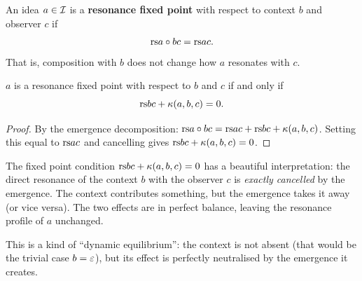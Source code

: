 \begin{definition}
\label{def:resonance-fp}
An idea $a \in \mathcal{I}$ is a \textbf{resonance fixed point} with respect to
context $b$ and observer $c$ if
\[
  \mathrm{rs}{a \circ b}{c} = \mathrm{rs}{a}{c}.
\]
That is, composition with $b$ does not change how $a$ resonates with $c$.
\end{definition}

\begin{proposition}
\label{prop:fp-char}
$a$ is a resonance fixed point with respect to $b$ and $c$ if and only if
\[
  \mathrm{rs}{b}{c} + \kappa(a, b, c) = 0.
\]
\end{proposition}

\begin{proof}
By the emergence decomposition:
$\mathrm{rs}{a \circ b}{c} = \mathrm{rs}{a}{c} + \mathrm{rs}{b}{c} + \kappa(a, b, c)$.
Setting this equal to $\mathrm{rs}{a}{c}$ and cancelling gives
$\mathrm{rs}{b}{c} + \kappa(a, b, c) = 0$.
\end{proof}

\begin{interpretation}
The fixed point condition $\mathrm{rs}{b}{c} + \kappa(a,b,c) = 0$ has a beautiful
interpretation: the direct resonance of the context $b$ with the observer $c$
is \emph{exactly cancelled} by the emergence.  The context contributes
something, but the emergence takes it away (or vice versa).  The two effects
are in perfect balance, leaving the resonance profile of $a$ unchanged.

This is a kind of ``dynamic equilibrium'': the context is not absent (that
would be the trivial case $b = \varepsilon$), but its effect is perfectly
neutralised by the emergence it creates.
\end{interpretation}

